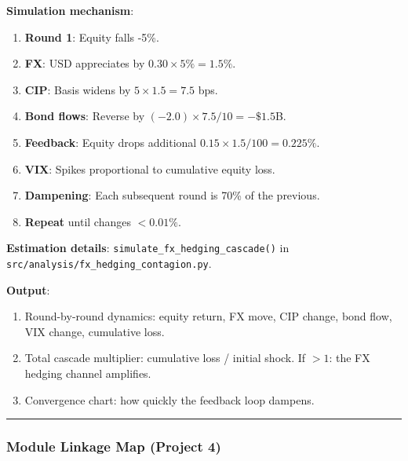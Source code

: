 \documentclass[11pt,a4paper]{article}
\begin{document}
\textbf{Simulation mechanism}:
\begin{enumerate}
\item \textbf{Round 1}: Equity falls -5\%.
\item \textbf{FX}: USD appreciates by $0.30 \times 5\% = 1.5\%$.
\item \textbf{CIP}: Basis widens by $5 \times 1.5 = 7.5$ bps.
\item \textbf{Bond flows}: Reverse by $(-2.0) \times 7.5/10 = -\$1.5$B.
\item \textbf{Feedback}: Equity drops additional $0.15 \times 1.5/100 = 0.225\%$.
\item \textbf{VIX}: Spikes proportional to cumulative equity loss.
\item \textbf{Dampening}: Each subsequent round is 70\% of the previous.
\item \textbf{Repeat} until changes $< 0.01\%$.

\end{enumerate}
\textbf{Estimation details}: \texttt{simulate\_fx\_hedging\_cascade()} in \texttt{src/analysis/fx\_hedging\_contagion.py}.

\textbf{Output}:
\begin{enumerate}
\item Round-by-round dynamics: equity return, FX move, CIP change, bond flow, VIX change, cumulative loss.
\item Total cascade multiplier: cumulative loss / initial shock. If $> 1$: the FX hedging channel amplifies.
\item Convergence chart: how quickly the feedback loop dampens.

\end{enumerate}

\bigskip\noindent\rule{\textwidth}{0.4pt}\bigskip


\subsubsection{Module Linkage Map (Project 4)}
\end{document}
